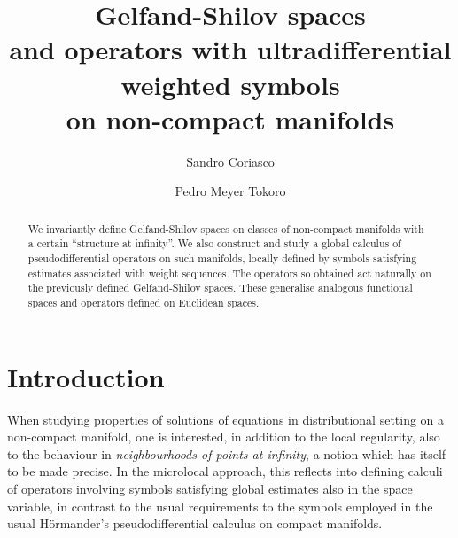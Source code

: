 \documentclass[11pt,reqno]{amsart}
\numberwithin{equation}{section}
\begin{document}
	
	\title[Gelfand-Shilov spaces and ultradifferential SG-operators on manifolds]{Gelfand-Shilov spaces\\and operators with ultradifferential weighted symbols\\
	  on non-compact manifolds}
	
	\author[S. Coriasco]{Sandro Coriasco}
	\address{
		Dipartimento di Matematica ``G. Peano'',
		Universit\`a degli Studi di Torino,  
		V. C. Alberto, n. 10, I-10123 Torino 
		Italy}

	\author[P.M. Tokoro]{Pedro Meyer Tokoro}
	\address{
		Programa de P\'os-Gradua\c c\~ao em Matem\'atica,  
		Universidade Federal do Paran\'a,  
		Caixa Postal 19096\\  CEP 81530-090, Curitiba, Paran\'a,  
		Brasil}
	
	
	
	
	\begin{abstract}
		We invariantly define Gelfand-Shilov spaces on classes of non-compact manifolds with a certain ``structure at infinity''.
		We also construct and study a global calculus of pseudodifferential operators on such manifolds, locally defined by symbols
		satisfying estimates associated with weight sequences. The operators so obtained act naturally on the previously
		defined Gelfand-Shilov spaces. These generalise analogous functional spaces and operators defined on Euclidean spaces.
	\end{abstract}
	
	\maketitle

	
\section{Introduction}\label{sec:intro}

When studying properties of solutions of equations in distributional setting on a non-compact manifold,
one is interested, in addition to the local regularity, also to the behaviour in \textit{neighbourhoods of points at infinity}, 
a notion which has itself to be made precise. In the microlocal approach, this reflects into defining calculi of operators involving
symbols satisfying global estimates also in the space variable, in contrast to the usual requirements to the symbols employed 
in the usual H\"ormander's pseudodifferential calculus on compact manifolds.
\end{document}
